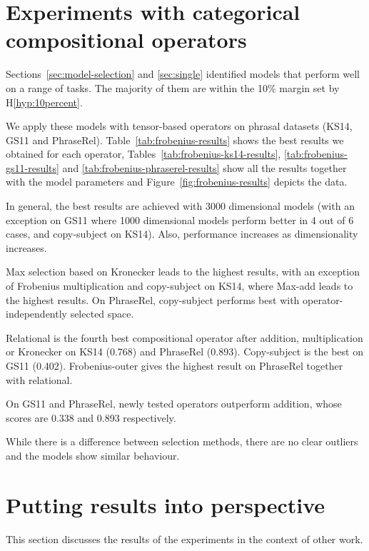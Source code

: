 \section{Experiments with categorical compositional operators}
\label{sec:frob-comp-oper}

Sections~\ref{sec:model-selection} and \ref{sec:single} identified models that perform well on a range of tasks. The majority of them are within the 10\% margin set by H\ref{hyp:10percent}.



We apply these models with tensor-based operators on phrasal datasets (KS14, GS11 and PhraseRel). Table~\ref{tab:frobenius-results} shows the best results we obtained for each operator, Tables~\ref{tab:frobenius-ks14-results}, \ref{tab:frobenius-gs11-results} and \ref{tab:frobenius-phraserel-results} show all the results together with the model parameters and Figure~\ref{fig:frobenius-results} depicts the data.

In general, the best results are achieved with 3000 dimensional models (with an exception on GS11 where 1000 dimensional models perform better in 4 out of 6 cases, and copy-subject on KS14). Also, performance increases as dimensionality increases.

Max selection based on Kronecker leads to the highest results, with an exception of Frobenius multiplication and copy-subject on KS14, where Max-add leads to the highest results. On PhraseRel, copy-subject performs best with operator-independently selected space.

Relational is the fourth best compositional operator after addition, multiplication or Kronecker on KS14 (0.768) and PhraseRel (0.893). Copy-subject is the best on GS11 (0.402). Frobenius-outer gives the highest result on PhraseRel together with relational.

On GS11 and PhraseRel, newly tested operators outperform addition, whose scores are 0.338 and 0.893 respectively.

While there is a difference between selection methods, there are no clear outliers and the models show similar behaviour.

\section{Putting results into perspective}
\label{sec:comp-with-other}

This section discusses the results of the experiments in the context of other work.

